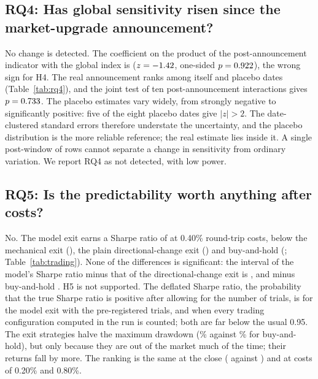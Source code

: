 \subsection{RQ4: Has global sensitivity risen since the market-upgrade announcement?}\label{sec:rq4}

No change is detected. The coefficient on the product of the post-announcement indicator with
the global index is \HFourCoef{} ($z=-1.42$, one-sided $p=0.922$), the wrong sign for H4. The
real announcement ranks \HFourRank{} among itself and \HFourPlacebos{} placebo dates
(Table~\ref{tab:rq4}), and the joint test of ten post-announcement interactions gives
$p=0.733$. The placebo estimates vary widely, from strongly negative to significantly
positive: five of the eight placebo dates give $|z|>2$. The date-clustered standard errors
therefore understate the uncertainty, and the placebo distribution is the more reliable reference;
the real estimate lies inside it. A single post-window of \HFourPostRows{} rows cannot separate a
change in sensitivity from ordinary variation. We report RQ4 as not detected, with low power.

\begin{table}[!htbp]
\centering
\caption{Market-upgrade test (H4, exploratory, in-sample). $\hat\lambda$ is the coefficient on the
post-announcement indicator times the global linear index of \texttt{ABCDx}; one-sided $p$ for
$\lambda>0$ with date-clustered errors. Placebos use the same design at earlier dates, with
windows that end before the real announcement. The real date is ranked among the placebos by
$z$.}\label{tab:rq4}
\footnotesize
{}
\end{table}

\subsection{RQ5: Is the predictability worth anything after costs?}\label{sec:rq5}

No. The model exit earns a Sharpe ratio of \BtOpenSharpeModel{} at 0.40\% round-trip costs,
below the mechanical exit (\BtOpenSharpeMech), the plain directional-change exit
(\BtOpenSharpeDc) and buy-and-hold (\BtOpenSharpeBh; Table~\ref{tab:trading}). None of the
differences is significant: the interval of the model's Sharpe ratio minus that of the
directional-change exit is \BtOpenSDModelDc, and minus buy-and-hold \BtOpenSDModelBh. H5 is not
supported. The deflated Sharpe ratio, the probability that the true Sharpe ratio is positive
after allowing for the number of trials, is \BtOpenDSRModel{} for the model exit with the
pre-registered \BtOpenDSRTrials{} trials, and \BtOpenDSRNNineSix{} when every trading configuration
computed in the run is counted; both are far below the usual 0.95. The exit
strategies halve the maximum drawdown (\BtOpenMDDModel\% against \BtOpenMDDBh\% for
buy-and-hold), but only because they are out of the market much of the time; their returns fall by
more. The ranking is the same at the close (\BtCloseSharpeModel{} against \BtCloseSharpeBh) and at
costs of 0.20\% and 0.80\%.

